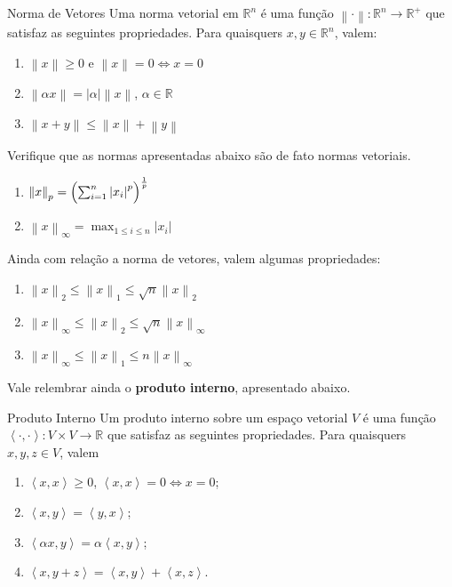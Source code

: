 \documentclass[12pt,openany]{book}
\newcommand{\R}{\mathbb{R}}
\newcommand{\norm}[1]{\left\lVert #1 \right\rVert}
\newcommand{\abs}[1]{\left\lvert #1 \right\rvert}
\newcommand{\inner}[2]{\left\langle #1, #2 \right\rangle}
\begin{document}
\begin{definition}{Norma de Vetores}{}
    Uma norma vetorial em $\R^n$ é uma função $\norm{\cdot} \colon \R^n \to \R^+$ que satisfaz as seguintes propriedades.
    Para quaisquers $x, y \in \R^n$, valem:

    \begin{enumerate}[label=\roman*)]
        \item $\norm{x} \geq 0$ e $\norm{x} = 0 \Leftrightarrow x = 0$
        \item $\norm{\alpha x} = \abs{\alpha}\norm{x}$, $\alpha \in \R$
        \item $\norm{x + y} \leq \norm{x} + \norm{y}$
    \end{enumerate}
\end{definition}

\begin{exercise}{}{}
    Verifique que as normas apresentadas abaixo são de fato normas vetoriais.

    \begin{enumerate}[label=\arabic*)]
        \item $\norm{x}_p = \Bigl( \sum_{i = 1}^n \abs{x_i}^p \Bigr)^{\frac{1}{p}}$
        \item $\norm{x}_\infty = \max_{1 \leq i \leq n} \abs{x_i}$
    \end{enumerate}
\end{exercise}

Ainda com relação a norma de vetores, valem algumas propriedades:
\begin{enumerate}[label=P\arabic*)]
    \item $\norm{x}_2 \leq \norm{x}_1 \leq \sqrt{n}\norm{x}_2$
    \item $\norm{x}_\infty \leq \norm{x}_2 \leq \sqrt{n}\norm{x}_\infty$
    \item $\norm{x}_\infty \leq \norm{x}_1 \leq n\norm{x}_\infty$
\end{enumerate}

Vale relembrar ainda o \textbf{produto interno}, apresentado abaixo.

\begin{definition}{Produto Interno}{}
    Um produto interno sobre um espaço vetorial $V$ é uma função $\inner{\cdot}{\cdot} \colon V \times V \to \R$ que satisfaz as seguintes propriedades.
    Para quaisquers $x, y, z \in V$, valem

    \begin{enumerate}[label=\roman*)]
        \item $\inner{x}{x} \geq 0$, $\inner{x}{x} = 0 \Leftrightarrow x = 0$;
        \item $\inner{x}{y} = \inner{y}{x}$;
        \item $\inner{\alpha x}{y} = \alpha \inner{x}{y}$;
        \item $\inner{x}{y + z} = \inner{x}{y} + \inner{x}{z}$.
    \end{enumerate}
\end{definition}
\end{document}
